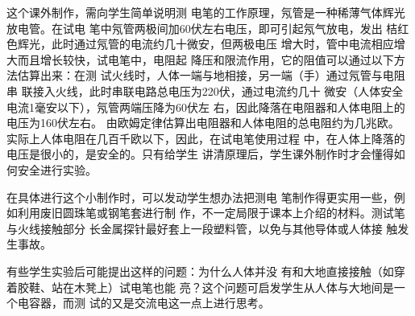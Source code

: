 这个课外制作，需向学生简单说明测
电笔的工作原理，氖管是一种稀薄气体辉光放电管。在试电
笔中氖管两极间加60伏左右电压，即可引起氖气放电，发出
桔红色辉光，此时通过氖管的电流约几十微安，但两极电压
增大时，管中电流相应增大而且增长较快，试电笔中，电阻起
降压和限流作用，它的阻值可以通过以下方法估算出来：在测
试火线时，人体一端与地相接，另一端（手）通过氖管与电阻串
联接入火线，此时串联电路总电压为220伏，通过电流约几十
微安（人体安全电流1毫安以下），氖管两端压降为60伏左
右，因此降落在电阻器和人体电阻上的电压为160伏左右。
由欧姆定律估算出电阻器和人体电阻的总电阻约为几兆欧。
实际上人体电阻在几百千欧以下，因此，在试电笔使用过程
中，在人体上降落的电压是很小的，是安全的。只有给学生
讲清原理后，学生课外制作时才会懂得如何安全进行实验。

在具体进行这个小制作时，可以发动学生想办法把测电
笔制作得更实用一些，例如利用废旧圆珠笔或钢笔套进行制
作，不一定局限于课本上介绍的材料。测试笔与火线接触部分
长金属探针最好套上一段塑料管，以免与其他导体或人体接
触发生事故。

有些学生实验后可能提出这样的问题：为什么人体并没
有和大地直接接触（如穿着胶鞋、站在木凳上）试电笔也能
亮？这个问题可启发学生从人体与大地间是一个电容器，而测
试的又是交流电这一点上进行思考。











\begin{figure}[htp]
    \centering
    \caption{}
\end{figure}

























































































